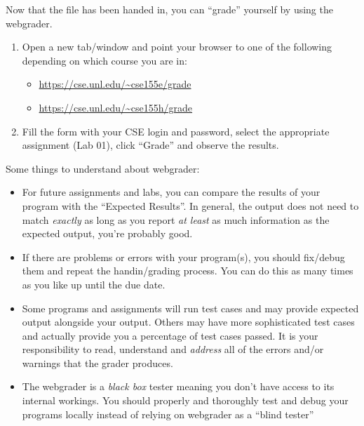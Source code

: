 \documentclass[12pt]{scrartcl}
\begin{document}
Now that the file has been handed in, you can ``grade'' yourself 
by using the webgrader.

\begin{enumerate}
  \item Open a new tab/window and point your browser to one of 
  the following depending on which course you are in:
  \begin{itemize}
    \item \url{https://cse.unl.edu/~cse155e/grade}
    \item \url{https://cse.unl.edu/~cse155h/grade}
  \end{itemize}
  \item Fill the form with your CSE login and password, select 
  the appropriate assignment (Lab 01), click ``Grade'' and
  observe the results.
\end{enumerate}

Some things to understand about webgrader:
\begin{itemize}
  \item For future assignments and labs, you can compare the results of 
  	your program with the ``Expected Results''.  In general, the output
	does not need to match \emph{exactly} as long as you report \emph{at least}
	as much information as the expected output, you're probably good.
  \item If there are problems or errors with your program(s), 
    you should fix/debug them and repeat the handin/grading process.
	You can do this as many times as you like up until the due date.  
  \item Some programs 
	and assignments will run test cases and may provide expected output alongside 
	your output.  Others may have more sophisticated test cases and actually provide 
	you a percentage of test cases passed.  It is your responsibility to read, 
	understand and \emph{address} all of the errors and/or warnings that the grader produces.
  \item The webgrader is a \emph{black box} tester meaning you don't have
  access to its internal workings.  You should properly and thoroughly test
  and debug your programs locally instead of relying on webgrader as a 
  ``blind tester''
\end{itemize}
\end{document}
